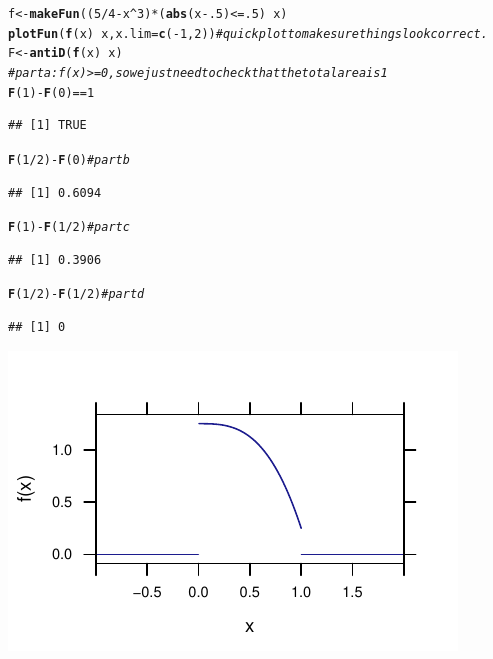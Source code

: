\documentclass[twoside]{book}\usepackage[]{graphicx}\usepackage[]{xcolor}
\makeatletter
\def\maxwidth{ %
  \ifdim\Gin@nat@width>\linewidth
    \linewidth
  \else
    \Gin@nat@width
  \fi
}
\newcommand{\hlnum}[1]{\textcolor[rgb]{0.686,0.059,0.569}{#1}}%
\newcommand{\hlcom}[1]{\textcolor[rgb]{0.678,0.584,0.686}{\textit{#1}}}%
\newcommand{\hlopt}[1]{\textcolor[rgb]{0,0,0}{#1}}%
\newcommand{\hlstd}[1]{\textcolor[rgb]{0.345,0.345,0.345}{#1}}%
\newcommand{\hlkwb}[1]{\textcolor[rgb]{0.69,0.353,0.396}{#1}}%
\newcommand{\hlkwc}[1]{\textcolor[rgb]{0.333,0.667,0.333}{#1}}%
\newcommand{\hlkwd}[1]{\textcolor[rgb]{0.737,0.353,0.396}{\textbf{#1}}}%
\newenvironment{kframe}{%
 \def\at@end@of@kframe{}%
 \ifinner\ifhmode%
  \def\at@end@of@kframe{\end{minipage}}%
  \begin{minipage}{\columnwidth}%
 \fi\fi%
 \def\FrameCommand##1{\hskip\@totalleftmargin \hskip-\fboxsep
 \colorbox{shadecolor}{##1}\hskip-\fboxsep
     \hskip-\linewidth \hskip-\@totalleftmargin \hskip\columnwidth}%
 \MakeFramed {\advance\hsize-\width
   \@totalleftmargin\z@ \linewidth\hsize
   \@setminipage}}%
 {\par\unskip\endMakeFramed%
 \at@end@of@kframe}
\newenvironment{knitrout}{}{} %
\makeatother
\begin{document}
\begin{solution}
\begin{knitrout}
\color{fgcolor}\begin{kframe}
\begin{alltt}
\hlstd{f} \hlkwb{<-} \hlkwd{makeFun}\hlstd{( (}\hlnum{5}\hlopt{/}\hlnum{4} \hlopt{-} \hlstd{x}\hlopt{^}\hlnum{3}\hlstd{)} \hlopt{*} \hlstd{(} \hlkwd{abs}\hlstd{(x}\hlopt{-}\hlnum{.5}\hlstd{)} \hlopt{<=} \hlnum{.5} \hlstd{)} \hlopt{~} \hlstd{x )}
\hlkwd{plotFun}\hlstd{(}\hlkwd{f}\hlstd{(x)} \hlopt{~} \hlstd{x,} \hlkwc{x.lim} \hlstd{=} \hlkwd{c}\hlstd{(}\hlopt{-}\hlnum{1}\hlstd{,}\hlnum{2}\hlstd{))}  \hlcom{# quick plot to make sure things look correct.}
\hlstd{F} \hlkwb{<-} \hlkwd{antiD}\hlstd{(}\hlkwd{f}\hlstd{(x)} \hlopt{~}\hlstd{x)}
\hlcom{# part a:  f(x) >=0, so we just need to check that the total area is 1}
\hlkwd{F}\hlstd{(}\hlnum{1}\hlstd{)} \hlopt{-} \hlkwd{F}\hlstd{(}\hlnum{0}\hlstd{)} \hlopt{==} \hlnum{1}
\end{alltt}
\begin{verbatim}
## [1] TRUE
\end{verbatim}
\begin{alltt}
\hlkwd{F}\hlstd{(}\hlnum{1}\hlopt{/}\hlnum{2}\hlstd{)} \hlopt{-} \hlkwd{F}\hlstd{(}\hlnum{0}\hlstd{)}     \hlcom{# part b}
\end{alltt}
\begin{verbatim}
## [1] 0.6094
\end{verbatim}
\begin{alltt}
\hlkwd{F}\hlstd{(}\hlnum{1}\hlstd{)} \hlopt{-} \hlkwd{F}\hlstd{(}\hlnum{1}\hlopt{/}\hlnum{2}\hlstd{)}     \hlcom{# part c}
\end{alltt}
\begin{verbatim}
## [1] 0.3906
\end{verbatim}
\begin{alltt}
\hlkwd{F}\hlstd{(}\hlnum{1}\hlopt{/}\hlnum{2}\hlstd{)} \hlopt{-} \hlkwd{F}\hlstd{(}\hlnum{1}\hlopt{/}\hlnum{2}\hlstd{)}   \hlcom{# part d}
\end{alltt}
\begin{verbatim}
## [1] 0
\end{verbatim}
\end{kframe}

{\centering \includegraphics[width=\maxwidth]{figures/fig-unnamed-chunk-69-1} 

}
\end{knitrout}
\end{solution}
\end{document}
